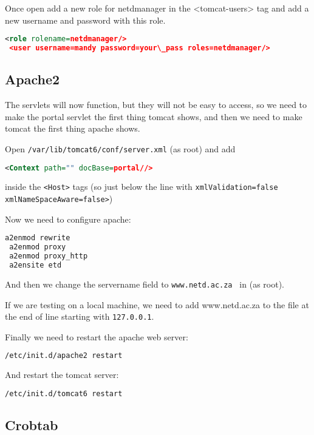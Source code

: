 \documentclass[a4paper,11pt]{article}
\begin{document}
Once open add a new role for netdmanager in the <tomcat-users> tag and add a new username and password with this role. 

\begin{lstlisting}[language=XML]
 <role rolename=netdmanager/> 
 <user username=mandy password=your\_pass roles=netdmanager/>
\end{lstlisting}

\subsection{Apache2}

The servlets will now function, but they will not be easy to access, so we need to make the portal servlet the first thing tomcat shows, and then we need to make tomcat the first thing apache shows.

Open \texttt{/var/lib/tomcat6/conf/server.xml} (as root) and add 

\begin{lstlisting}[language=XML]
 <Context path="" docBase=portal//> 
\end{lstlisting}

inside the \texttt{<Host>} tags (so just below the line with \texttt{xmlValidation=false xmlNameSpaceAware=false>})

Now we need to configure apache: 

\begin{lstlisting}[language=bash]
 a2enmod rewrite 
 a2enmod proxy 
 a2enmod proxy_http 
 a2ensite etd
\end{lstlisting}

And then we change the servername field to \texttt{www.netd.ac.za } in  (as root).

If we are testing on a local machine, we need to add www.netd.ac.za to the  file at the end of line starting with \texttt{127.0.0.1}.

Finally we need to restart the apache web server: 

\begin{lstlisting}[language=bash]
 /etc/init.d/apache2 restart
\end{lstlisting}

And restart the tomcat server: 

\begin{lstlisting}[language=bash]
 /etc/init.d/tomcat6 restart
\end{lstlisting}

\subsection{Crobtab}
\end{document}
